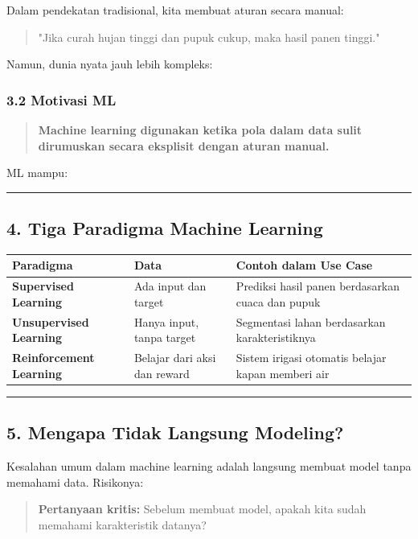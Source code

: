 \documentclass[12pt,a4paper]{article}
\begin{document}
Dalam pendekatan tradisional, kita membuat aturan secara manual:


\begin{quote}
"Jika curah hujan tinggi dan pupuk cukup, maka hasil panen tinggi."\end{quote}


Namun, dunia nyata jauh lebih kompleks:


\subsubsection{3.2 Motivasi ML}

\begin{quote}
\textbf{Machine learning digunakan ketika pola dalam data sulit dirumuskan secara eksplisit dengan aturan manual.}\end{quote}


ML mampu:


\hrule


\subsection{4. Tiga Paradigma Machine Learning}

\begin{tabular}{|l|l|l|}
\hline
Paradigma & Data & Contoh dalam Use Case \\
\hline
\textbf{Supervised Learning} & Ada input dan target & Prediksi hasil panen berdasarkan cuaca dan pupuk \\
\hline
\textbf{Unsupervised Learning} & Hanya input, tanpa target & Segmentasi lahan berdasarkan karakteristiknya \\
\hline
\textbf{Reinforcement Learning} & Belajar dari aksi dan reward & Sistem irigasi otomatis belajar kapan memberi air \\
\hline
\end{tabular}


\hrule


\subsection{5. Mengapa Tidak Langsung Modeling?}

Kesalahan umum dalam machine learning adalah langsung membuat model tanpa memahami data. Risikonya:



\begin{quote}
\textbf{Pertanyaan kritis:} Sebelum membuat model, apakah kita sudah memahami karakteristik datanya?\end{quote}
\end{document}
